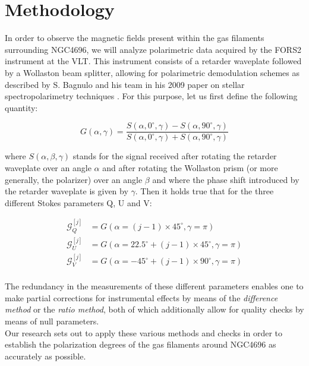 \documentclass[twoside,single]{lion-msc}
\begin{document}
    
    
    
\chapter{Methodology}    

    In order to observe the magnetic fields present within the gas filaments surrounding NGC4696, we will analyze polarimetric data acquired by the FORS2 instrument at the VLT. This instrument consists of a retarder waveplate followed by a Wollaston beam splitter, allowing for polarimetric demodulation schemes as described by S. Bagnulo and his team in his 2009 paper on stellar spectropolarimetry techniques \citep{Bagnulo2009}. For this purpose, let us first define the following quantity:
    
    \begin{equation}
        G(\alpha, \gamma) = \frac{S(\alpha, 0^{\circ}, \gamma) - S(\alpha, 90^{\circ}, \gamma)}{S(\alpha, 0^{\circ}, \gamma) + S(\alpha, 90^{\circ}, \gamma)}
    \end{equation}

    where $S(\alpha, \beta, \gamma)$ stands for the signal received after rotating the retarder waveplate over an angle $\alpha$ and after rotating the Wollaston prism (or more generally, the polarizer) over an angle $\beta$ and where the phase shift introduced by the retarder waveplate is given by $\gamma$. Then it holds true that for the three different Stokes parameters Q, U and V:
    
    \begin{align*}
        \mathcal{G}^{[j]}_{Q} &= G(\alpha = (j-1) \times 45^{\circ}, \gamma = \pi) \\
        \mathcal{G}^{[j]}_{U} &= G(\alpha = 22.5^{\circ} + (j-1) \times 45^{\circ}, \gamma = \pi) \\
        \mathcal{G}^{[j]}_{V} &= G(\alpha = -45^{\circ} + (j-1) \times 90^{\circ}, \gamma = \pi) \\
    \end{align*}

    The redundancy in the measurements of these different parameters enables one to make partial corrections for instrumental effects by means of the \textit{difference method} or the \textit{ratio method}, both of which additionally allow for quality checks by means of null parameters. \\
    Our research sets out to apply these various methods and checks in order to establish the polarization degrees of the gas filaments around NGC4696 as accurately as possible.
    
\end{document}
